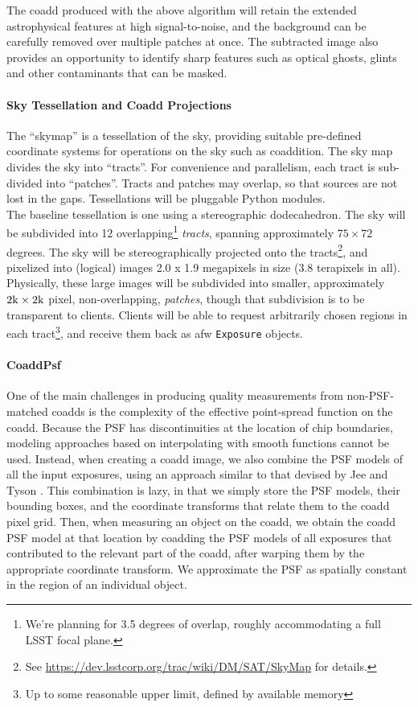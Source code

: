 \documentclass[12pt]{article}
\begin{document}
The coadd produced with the above algorithm will retain the extended astrophysical features at high signal-to-noise, and the background can be carefully removed over multiple patches at once. The subtracted image also provides an opportunity to identify sharp features such as optical ghosts, glints and other contaminants that can be masked.

\paragraph{Sky Tessellation and Coadd Projections}
\label{alg:skymap}

The ``skymap'' is a tessellation of the sky, providing suitable pre-defined coordinate systems for operations on the sky such as coaddition.  The sky map divides the sky into ``tracts''.  For convenience and parallelism, each tract is sub-divided into ``patches''.  Tracts and patches may overlap, so that sources are not lost in the gaps. Tessellations will be pluggable Python modules.
\\

The baseline tessellation is one using a stereographic dodecahedron. The sky will be subdivided into 12 overlapping\footnote{We're planning for 3.5 degrees of overlap, roughly accommodating a full LSST focal plane.} {\em tracts}, spanning approximately $75 \times 72$ degrees. The sky will be stereographically projected onto the tracts\footnote{See \url{https://dev.lsstcorp.org/trac/wiki/DM/SAT/SkyMap} for details.}, and pixelized into (logical) images 2.0 x 1.9 megapixels in size (3.8 terapixels in all). Physically, these large images will be subdivided into smaller, approximately $2{\rm k} \times 2{\rm k}$ pixel, non-overlapping, {\em patches}, though that subdivision is to be transparent to clients. Clients will be able to request arbitrarily chosen regions in each tract\footnote{Up to some reasonable upper limit, defined by available memory}, and receive them back as afw {\tt Exposure} objects.

\paragraph{CoaddPsf}
\label{alg:coaddPsf}

One of the main challenges in producing quality measurements from
non-PSF-matched coadds is the complexity of the effective point-spread
function on the coadd.  Because the PSF has discontinuities at the
location of chip boundaries, modeling approaches based on
interpolating with smooth functions cannot be used.  Instead, when
creating a coadd image, we also combine the PSF models of all the
input exposures, using an approach similar to that devised by
Jee and Tyson \cite{JeeTyson11}.  This combination is lazy, in that we simply store the
PSF models, their bounding boxes, and the coordinate transforms that
relate them to the coadd pixel grid.  Then, when measuring an object
on the coadd, we obtain the coadd PSF model at that location by coadding the
PSF models of all exposures that contributed to the relevant part of
the coadd, after warping them by the appropriate coordinate
transform.  We approximate the PSF as spatially constant in the region
of an individual object.
\end{document}

